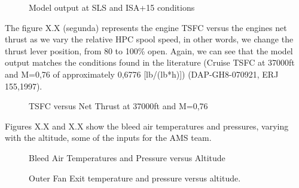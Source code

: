 \begin{figure}[H] %
\caption{Model output at SLS and ISA+15 conditions}
\label{fig:SLSandISA}
\end{figure}


The figure X.X (segunda) represents the engine TSFC versus the engines net thrust as we vary the relative HPC spool speed, in other words, we change the thrust lever position, from 80 to 100\% open. Again, we can see that the model output matches the conditions found in the literature (Cruise TSFC at 37000ft and M=0,76 of approximately  0,6776 [lb/(lb*h)]) (DAP-GH8-070921, ERJ 155,1997).


\begin{figure}[H] %
\caption{TSFC versus Net Thrust at 37000ft and M=0,76}
\label{fig:TSFC}
\end{figure}


Figures X.X and X.X show the bleed air temperatures and pressures, varying with the altitude, some of the inputs for the AMS team.


\begin{figure}[H] %
\caption{Bleed Air Temperatures and Pressure versus Altitude}
\label{fig:BleedAir}
\end{figure}


\begin{figure}[H] %
\caption{Outer Fan Exit temperature and pressure versus altitude.}
\label{fig:FanAir}
\end{figure}


